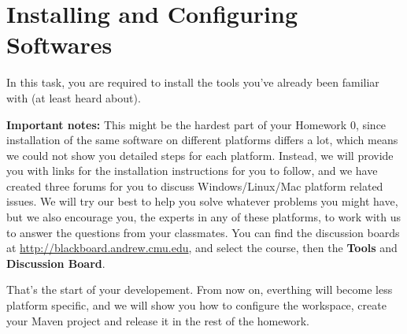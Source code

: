 
\chapter{Installing and Configuring Softwares}

In this task, you are required to install the tools you've already been familiar
with (at least heard about).

\textbf{Important notes:} This might be the hardest part of your Homework 0,
since installation of the same software on different platforms differs a lot,
which means we could not show you detailed steps for each platform. Instead, we
will provide you with links for the installation instructions for you to follow,
and we have created three forums for you to discuss Windows/Linux/Mac platform
related issues. We will try our best to help you solve whatever problems you
might have, but we also encourage you, the experts in any of these platforms, to
work with us to answer the questions from your classmates. You can find the
discussion boards at \url{http://blackboard.andrew.cmu.edu}, and select the
course, then the \textbf{Tools} and \textbf{Discussion Board}.









That's the start of your developement. From now on, everthing will become less
platform specific, and we will show you how to configure the workspace, create
your Maven project and release it in the rest of the homework.


